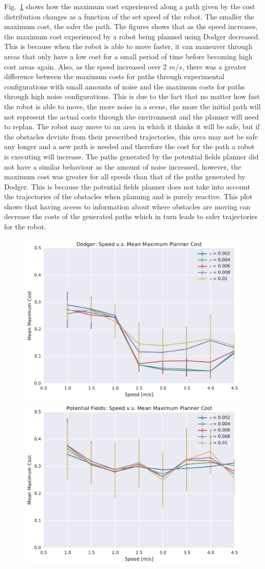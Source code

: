 Fig.~\ref{fig:plot_max_cost} shows how the maximum cost experienced along a
path given by the cost distribution changes as a function of the set speed of
the robot. The smaller the maximum cost, the safer the path. The figures shows
that as the speed increases, the maximum cost experienced by a robot being
planned using Dodger decreased. This is because when the robot is able to move
faster, it can maneuver through areas that only have a low cost for a small
period of time before becoming high cost areas again. Also, as the speed
increased over 2 $m/s$, there was a greater difference between the maximum
costs for paths through experimental configurations with small amounts of noise
and the maximum costs for paths through high noise configurations.  This is due
to the fact that no matter how fast the robot is able to move, the more noise
in a scene, the more the initial path will not represent the actual costs
through the environment and the planner will need to replan. The robot may move
to an area in which it thinks it will be safe, but if the obstacles deviate
from their prescribed trajectories, this area may not be safe any longer and a
new path is needed and therefore the cost for the path a robot is executing
will increase.  The paths generated by the potential fields planner did not
have a similar behaviour as the amount of noise increased, however, the maximum
cost was greater for all speeds than that of the paths generated by Dodger.
This is because the potential fields planner does not take into account the
trajectories of the obstacles when planning and is purely reactive. This plot
shows that having access to information about where obstacles are moving can
decrease the costs of the generated paths which in turn leads to safer
trajectories for the robot.

\begin{figure}[h!]
    \centering
    \includegraphics[width=0.48\linewidth]{figs/planner_mean_max_cost_0}
    \includegraphics[width=0.48\linewidth]{figs/pf_mean_max_cost_0}
    \caption{}
    \label{fig:plot_max_cost}
\end{figure}

